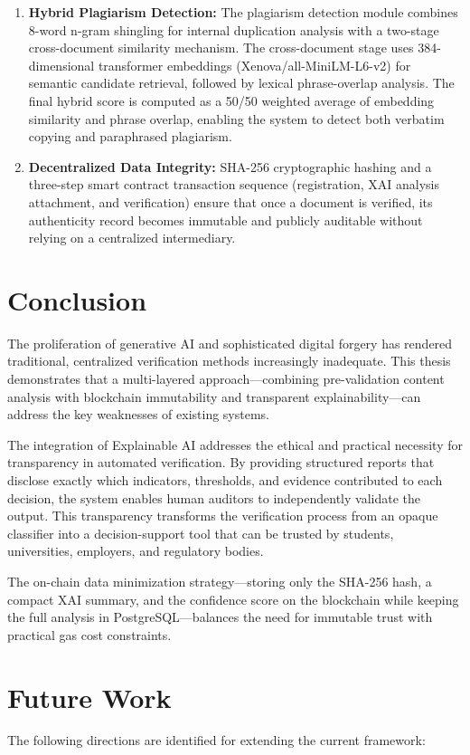 {\begin{enumerate}
    \item \textbf{Hybrid Plagiarism Detection:} The plagiarism detection module combines 8-word n-gram shingling for internal duplication analysis with a two-stage cross-document similarity mechanism. The cross-document stage uses 384-dimensional transformer embeddings (Xenova/all-MiniLM-L6-v2) for semantic candidate retrieval, followed by lexical phrase-overlap analysis. The final hybrid score is computed as a 50/50 weighted average of embedding similarity and phrase overlap, enabling the system to detect both verbatim copying and paraphrased plagiarism.

    \item \textbf{Decentralized Data Integrity:} SHA-256 cryptographic hashing and a three-step smart contract transaction sequence (registration, XAI analysis attachment, and verification) ensure that once a document is verified, its authenticity record becomes immutable and publicly auditable without relying on a centralized intermediary.
\end{enumerate}

\section{Conclusion}
The proliferation of generative AI and sophisticated digital forgery has rendered traditional, centralized verification methods increasingly inadequate. This thesis demonstrates that a multi-layered approach---combining pre-validation content analysis with blockchain immutability and transparent explainability---can address the key weaknesses of existing systems.

The integration of Explainable AI addresses the ethical and practical necessity for transparency in automated verification. By providing structured reports that disclose exactly which indicators, thresholds, and evidence contributed to each decision, the system enables human auditors to independently validate the output. This transparency transforms the verification process from an opaque classifier into a decision-support tool that can be trusted by students, universities, employers, and regulatory bodies.

The on-chain data minimization strategy---storing only the SHA-256 hash, a compact XAI summary, and the confidence score on the blockchain while keeping the full analysis in PostgreSQL---balances the need for immutable trust with practical gas cost constraints.

\section{Future Work}
The following directions are identified for extending the current framework:

}
